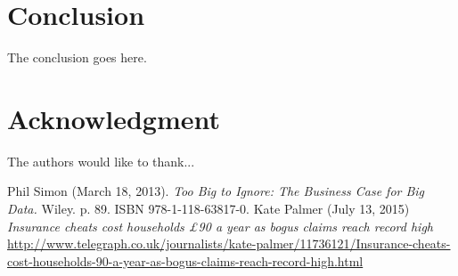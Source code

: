 \documentclass[conference, onecolumn]{IEEEtran}
\begin{document}
%



\section{Conclusion}
The conclusion goes here.






\section*{Acknowledgment}


The authors would like to thank...





\begin{thebibliography}{99}
 Phil Simon (March 18, 2013). \emph{Too Big to Ignore: The Business Case for Big Data.} Wiley. p. 89. ISBN 978-1-118-63817-0.
 Kate Palmer (July 13, 2015)  \emph{Insurance cheats cost households £90 a year as bogus claims reach record high}\\
\url{http://www.telegraph.co.uk/journalists/kate-palmer/11736121/Insurance-cheats-cost-households-90-a-year-as-bogus-claims-reach-record-high.html}


\end{thebibliography}
\end{document}
